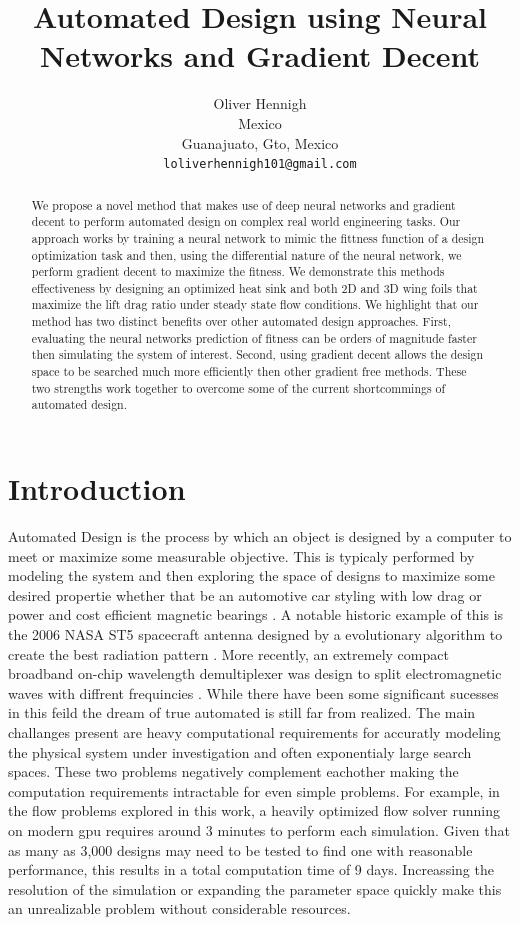 \documentclass{article} %
\title{Automated Design using Neural Networks and Gradient Decent}
\author{Oliver Hennigh \\
Mexico\\
Guanajuato, Gto, Mexico \\
\texttt{loliverhennigh101@gmail.com} \\
}
\begin{document}
\maketitle

\begin{abstract}

We propose a novel method that makes use of deep neural networks and gradient decent to perform automated design on complex real world engineering tasks. Our approach works by training a neural network to mimic the fittness function of a design optimization task and then, using the differential nature of the neural network, we perform gradient decent to maximize the fitness. We demonstrate this methods effectiveness by designing an optimized heat sink and both 2D and 3D wing foils that maximize the lift drag ratio under steady state flow conditions. We highlight that our method has two distinct benefits over other automated design approaches. First, evaluating the neural networks prediction of fitness can be orders of magnitude faster then simulating the system of interest. Second, using gradient decent allows the design space to be searched much more efficiently then other gradient free methods. These two strengths work together to overcome some of the current shortcommings of automated design.

\end{abstract}

\section{Introduction}

Automated Design is the process by which an object is designed by a computer to meet or maximize some measurable objective. This is typicaly performed by modeling the system and then exploring the space of designs to maximize some desired propertie whether that be an automotive car styling with low drag \cite{ando2010automotive} or power and cost efficient magnetic bearings \cite{dyck1996automated} . A notable historic example of this is the 2006 NASA ST5 spacecraft antenna designed by a evolutionary algorithm to create the best radiation pattern \cite{hornbyautomated}. More recently, an extremely compact broadband on-chip wavelength demultiplexer was design to split electromagnetic waves with diffrent frequincies \cite{piggott2015inverse}. While there have been some significant sucesses in this feild the dream of true automated is still far from realized. The main challanges present are heavy computational requirements for accuratly modeling the physical system under investigation and often exponentialy large search spaces. These two problems negatively complement eachother making the computation requirements intractable for even simple problems. For example, in the flow problems explored in this work, a heavily optimized flow solver running on modern gpu requires around 3 minutes to perform each simulation. Given that as many as 3,000 designs may need to be tested to find one with reasonable performance, this results in a total computation time of 9 days. Increassing the resolution of the simulation or expanding the parameter space quickly make this an unrealizable problem without considerable resources.
\end{document}
